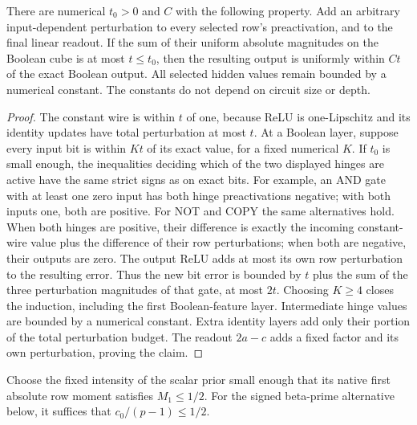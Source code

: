 \begin{lemma}
\label{lem:digital-restoration}
There are numerical $t_0>0$ and $C$ with the following property. Add an arbitrary input-dependent perturbation to every selected row's preactivation, and to the final linear readout. If the sum of their uniform absolute magnitudes on the Boolean cube is at most $t\le t_0$, then the resulting output is uniformly within $Ct$ of the exact Boolean output. All selected hidden values remain bounded by a numerical constant. The constants do not depend on circuit size or depth.
\end{lemma}
\begin{proof}
The constant wire is within $t$ of one, because ReLU is one-Lipschitz and its identity updates have total perturbation at most $t$. At a Boolean layer, suppose every input bit is within $K t$ of its exact value, for a fixed numerical $K$. If $t_0$ is small enough, the inequalities deciding which of the two displayed hinges are active have the same strict signs as on exact bits. For example, an AND gate with at least one zero input has both hinge preactivations negative; with both inputs one, both are positive. For NOT and COPY the same alternatives hold. When both hinges are positive, their difference is exactly the incoming constant-wire value plus the difference of their row perturbations; when both are negative, their outputs are zero. The output ReLU adds at most its own row perturbation to the resulting error. Thus the new bit error is bounded by $t$ plus the sum of the three perturbation magnitudes of that gate, at most $2t$. Choosing $K\ge4$ closes the induction, including the first Boolean-feature layer. Intermediate hinge values are bounded by a numerical constant. Extra identity layers add only their portion of the total perturbation budget. The readout $2a-c$ adds a fixed factor and its own perturbation, proving the claim.
\end{proof}

Choose the fixed intensity of the scalar prior small enough that its native first absolute row moment satisfies $M_1\le1/2$. For the signed beta-prime alternative below, it suffices that $c_0/(p-1)\le1/2$.

